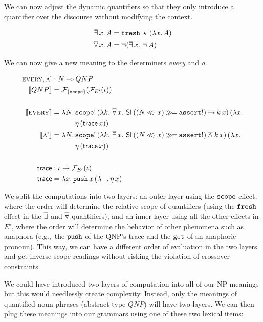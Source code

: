 We can now adjust the dynamic quantifiers so that they only introduce a
quantifier over the discourse without modifying the context.

\begin{align*}
  \mathop{\overline{\exists}} x.\,A &= \mathtt{fresh}\,\star\,(\lambda x.\, A) \\
  \mathop{\overline{\forall}} x.\,A &= \mathop{\overline{\lnot}} (\mathop{\overline{\exists}} x.\,\mathop{\overline{\lnot}} A)
\end{align*}

We can now give a new meaning to the determiners \emph{every} and \emph{a}.

\begin{align*}
  \textsc{every}, \textsc{a'} &: N \mathbin{{-}\mkern-3.5mu{\circ}} QNP \\
  \llbracket QNP \rrbracket &= \mathcal{F}_{\{\mathtt{scope}\}}(\mathcal{F}_{E'}(\iota)) \\
  \\
  \llbracket \textsc{every} \rrbracket &= \lambda N.\, \begin{aligned}[t]
      &\mathtt{scope}!\,(\lambda k.\, \mathop{\overline{\forall}} x.\ \textsf{SI}\,((N \mathbin{\ll\!\!\cdot} x) \mathbin{\gg\!=} \mathtt{assert}!) \mathbin{\overline{\to}} k\,x)\,(\lambda x.\,  \\
      &\eta\,(\textsf{trace}\,x))
    \end{aligned} \\
  \llbracket \textsc{a'} \rrbracket &= \lambda N.\, \begin{aligned}[t]
      &\mathtt{scope}!\,(\lambda k.\, \mathop{\overline{\exists}} x.\ \textsf{SI}\,((N \mathbin{\ll\!\!\cdot} x) \mathbin{\gg\!=} \mathtt{assert}!) \mathbin{\overline{\land}} k\,x)\,(\lambda x.\,  \\
      &\eta\,(\textsf{trace}\,x))
    \end{aligned} \\
  \\
  \textsf{trace} &: \iota \to \mathcal{F}_{E'}(\iota) \\
  \textsf{trace} &= \lambda x.\, \mathtt{push}\,x\,(\lambda \_.\, \eta\,x)
\end{align*}

We split the computations into two layers: an outer layer using the
$\mathtt{scope}$ effect, where the order will determine the relative scope of
quantifiers (using the $\mathtt{fresh}$ effect in the $\mathop{\overline{\exists}}$ and $\mathop{\overline{\forall}}$
quantifiers), and an inner layer using all the other effects in $E'$, where
the order will determine the behavior of other phenomena such as anaphora
(e.g.,\ the $\mathtt{push}$ of the QNP's trace and the $\mathtt{get}$ of an
anaphoric pronoun). This way, we can have a different order of evaluation
in the two layers and get inverse scope readings without risking the
violation of crossover constraints.

We could have introduced two layers of computation into all of our NP
meanings but this would needlessly create complexity. Instead, only the
meanings of quantified noun phrases (abstract type $QNP$) will have two
layers. We can then plug these meanings into our grammars using one of
these two lexical items:

